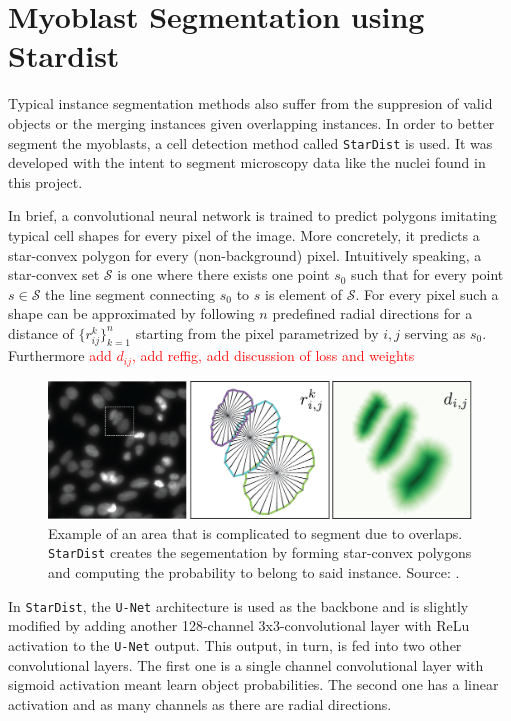 \section{Myoblast Segmentation using Stardist}
Typical instance segmentation methods also suffer from the suppresion of valid objects or the merging instances given overlapping instances. In order to better segment the myoblasts, a cell detection method called \texttt{StarDist} \cite{schmidt2018, weigert2020} is used. It was developed with the intent to segment microscopy data like the nuclei found in this project.

In brief, a convolutional neural network is trained to predict polygons imitating typical cell shapes for every pixel of the image. More concretely, it predicts a star-convex polygon for every (non-background) pixel. Intuitively speaking, a star-convex set $\mathcal{S}$ is one where there exists one point $s_{0}$ such that for every point $s \in \mathcal{S}$ the line segment connecting $s_{0}$ to $s$ is element of $\mathcal{S}$. For every pixel such a shape can be approximated by following $n$ predefined radial directions for a distance of $\{r^{k}_{ij}\}^{n}_{k = 1}$ starting from the pixel parametrized by $i,j$ serving as $s_{0}$. Furthermore \textcolor{red}{add $d_{ij}$, add reffig, add discussion of loss and weights}

\begin{figure}
	\centering
	\includegraphics[width=\textwidth]{"images/star_convexity_explained.png"}
	\caption{Example of an area that is complicated to segment due to overlaps. \texttt{StarDist} creates the segementation by forming star-convex polygons and computing the probability to belong to said instance. Source: \Cite{schmidt2018}.}
	\label{figstardistexplained}
\end{figure}

In \texttt{StarDist}, the \texttt{U-Net} architecture \cite{RonnebergerFB15} is used as the backbone and is slightly modified by adding another 128-channel 3x3-convolutional layer with ReLu activation to the \texttt{U-Net} output. This output, in turn, is fed into two other convolutional layers. The first one is a single channel convolutional layer with sigmoid activation meant learn object probabilities. The second one has a linear activation and as many channels as there are radial directions.